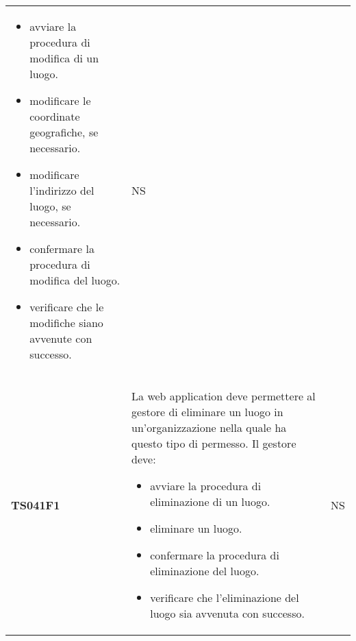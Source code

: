 \documentclass[../piano-di-qualifica.tex]{subfiles}
\begin{document}
\begin{centering}
\begin{longtable}[H]{>{\centering\bfseries}m{3cm} >{}p{10cm} >{\centering\arraybackslash}m{3cm}}
\begin{itemize}
                        \item avviare la procedura di modifica di un luogo.
                        \item modificare le coordinate geografiche, se necessario.
                        \item modificare l'indirizzo del luogo, se necessario.
                        \item confermare la procedura di modifica del luogo.
                        \item verificare che le modifiche siano avvenute con successo.
                      \end{itemize}
                    & NS \\
        TS041F1     & La web application deve permettere al gestore di eliminare un luogo in un'organizzazione nella quale ha questo tipo di permesso. \newline
                      Il gestore deve:
                      \begin{itemize}
                        \item avviare la procedura di eliminazione di un luogo.
                        \item eliminare un luogo.
                        \item confermare la procedura di eliminazione del luogo.
                        \item verificare che l'eliminazione del luogo sia avvenuta con successo.
                      \end{itemize}
                    & NS \\



\end{longtable}
\end{centering}
\end{document}
